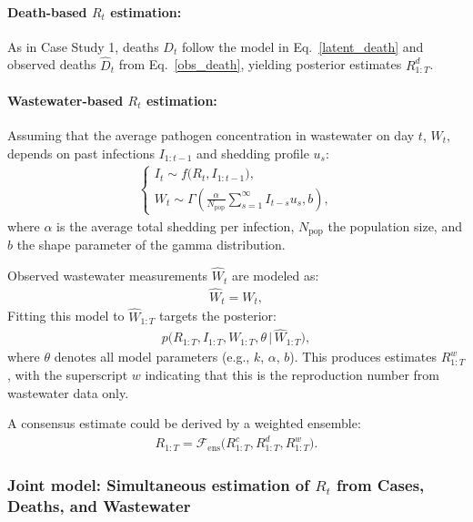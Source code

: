 \documentclass{article}
\begin{document}
\paragraph{Death-based $R_t$ estimation:}  
As in Case Study 1, deaths $D_t$ follow the model in Eq.~\eqref{latent_death} and observed deaths $\widehat{D}_t$ from  Eq.~\eqref{obs_death}, yielding posterior estimates $R_{1:T}^d$.

\paragraph{Wastewater-based $R_t$ estimation:}  
Assuming that the average pathogen concentration in wastewater on day $t$, $W_t$, depends on past infections $I_{1:t-1}$ and shedding profile $u_s$:
\begin{align}
\begin{cases}
I_t \sim f\big(R_t, I_{1:t-1}\big),\\[4pt]
W_t \sim \Gamma\left(\frac{\alpha}{N_{\mathrm{pop}}} \sum_{s=1}^\infty I_{t-s} u_s, b \right),
\end{cases}
\end{align}
where $\alpha$ is the average total shedding per infection, $N_{\mathrm{pop}}$ the population size, and $b$ the shape parameter of the gamma distribution.

Observed wastewater measurements $\widehat{W}_t$ are modeled as:
\begin{align}
\widehat{W}_t = W_t,
\end{align}
Fitting this model to $\widehat{W}_{1:T}$ targets the posterior:
\begin{align}
p\big(R_{1:T}, I_{1:T}, W_{1:T}, \theta \,\big|\, \widehat{W}_{1:T}\big),
\end{align}
where $\theta$ denotes all model parameters (e.g., $k$, $\alpha$, $b$).  This produces estimates $R_{1:T}^w$, with the superscript $w$ indicating that this is the reproduction number from wastewater data only. 

A consensus estimate could be derived by a weighted ensemble:
\begin{align}
R_{1:T} = \mathcal{F}_{\mathrm{ens}}\big(R_{1:T}^c, R_{1:T}^d, R_{1:T}^w \big).
\end{align}

\subsubsection{Joint model: Simultaneous estimation of $R_t$ from Cases, Deaths, and Wastewater}
\end{document}
